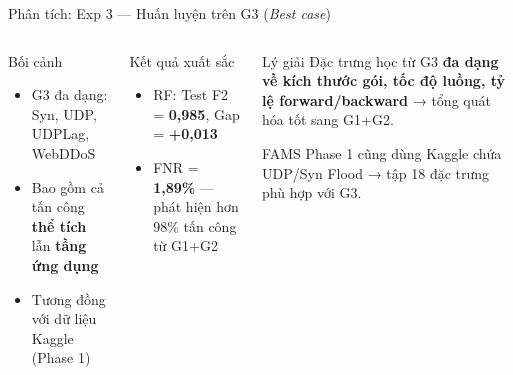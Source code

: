\documentclass[aspectratio=169,12pt]{beamer}
\newcommand{\good}[1]{\textcolor{mygreen}{\textbf{#1}}}
\begin{document}
\begin{frame}{Phân tích: Exp 3 --- Huấn luyện trên G3 (\textit{Best case})}
  \begin{columns}[T]
      \begin{block}{Bối cảnh}
        \begin{itemize}
          \item G3 đa dạng: Syn, UDP, UDPLag, WebDDoS
          \item Bao gồm cả tấn công \textbf{thể tích} lẫn \textbf{tầng ứng dụng}
          \item Tương đồng với dữ liệu Kaggle (Phase 1)
        \end{itemize}
      \end{block}
      \vspace{0.3em}
      \begin{block}{Kết quả xuất sắc}
        \begin{itemize}
          \item RF: Test F2 = \good{\textbf{0,985}}, Gap = \good{+0,013}
          \item FNR = \good{1,89\%} --- phát hiện hơn 98\% tấn công từ G1+G2
        \end{itemize}
      \end{block}
      \begin{alertblock}{Lý giải}
        Đặc trưng học từ G3 \textbf{đa dạng về kích thước gói, tốc độ luồng, tỷ lệ forward/backward} → tổng quát hóa tốt sang G1+G2.

        \vspace{0.4em}
        FAMS Phase 1 cũng dùng Kaggle chứa UDP/Syn Flood → tập 18 đặc trưng phù hợp với G3.
      \end{alertblock}
  \end{columns}
\end{frame}
\end{document}
